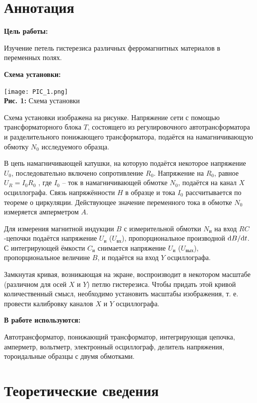 \documentclass[12pt,a4paper]{scrartcl}
\begin{document}
	\section{Аннотация}
	
	\textbf{Цель работы: }
	
	Изучение петель гистерезиса различных ферромагнитных материалов в переменных полях.
	
	\textbf{Схема установки:}
	\begin{center}
		\texttt{[image: PIC\_1.png]}
		\\\textbf{Рис. 1:} Схема установки
	\end{center}	
		
	Схема установки изображена на рисунке. Напряжение сети с помощью трансформаторного блока $T$, состоящего из 	регули­ровочного автотрансформатора и разделительного понижающего трансформатора, подаётся на 						намагничивающую обмотку $N_0$ исследуемого образца.
	
	В цепь намагничивающей катушки, на которую подаётся некоторое напряжение $U_0$, последовательно включено 		сопротивление $R_0$. Напряже­ние на $R_0$, равное $U_R = I_0 R_0$ , где $I_0$ -- ток в намагничивающей 			обмот­ке $N_0$, подаётся на канал $X$ осциллографа. Связь напряжённости $H$ в образце и тока $I_0$ 				рассчитывается по теореме о циркуляции. Действующее значение переменного тока в обмотке $N_0$ измеряется 		амперметром $A$.
	
	Для измерения магнитной индукции $B$ с измерительной обмотки $N_{\text{и}}$ на вход $RC$-цепочки подаётся 		напряжение $U_{\text{и}}$ ($U_{\text{вх}}$), пропорциональное производной $\mathrm{d} B/\mathrm{d} t$. С интегрирующей 		ёмкости $C_{\text{и}}$ снимается напряже­ние $U_{\textbf{и}}$ ($U_{\text{вых}}$), пропорциональное величине 		$B$, и подаётся на вход $Y$ осциллографа.

	Замкнутая кривая, возникающая на экране, воспроизводит в неко­тором масштабе (различном для осей $X$ и $Y$) 		петлю гистерезиса. Что­бы придать этой кривой количественный смысл, необходимо установить масштабы 				изображения, т. е. провести калибровку каналов $X$ и $Y$ осцил­лографа.

	\textbf{В работе используются:}
	
	Автотрансформатор, понижающий трансформатор, интегрирующая цепочка, амперметр, вольтметр, электронный 			осциллограф, делитель напряжения, тороидальные образцы с двумя обмотками.

	\section{Теоретические сведения}
\end{document}
